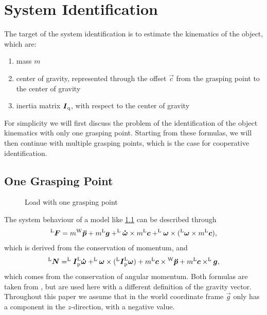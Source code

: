 

\chapter{System Identification}
\label{chap:system_identification}

The target of the system identification is to estimate the kinematics of the object, which are:
\begin{enumerate}
	\item mass $m$
	\item center of gravity, represented through the offset $\vec c$ from the grasping point to the center of gravity
	\item inertia matrix $\boldsymbol{I}_{\mathrm{q}}$, with respect to the center of gravity
\end{enumerate}

For simplicity we will first discuss the problem of the identification of the object kinematics with only one grasping point. Starting from these formulas, we will then continue with multiple grasping points, which is the case for cooperative identification.

\section{One Grasping Point}
\label{sec:one_grasping_point}

\begin{figure}
	\centering
	
	\caption{Load with one grasping point}
	\label{fig:load_one_grasping_point}
\end{figure}

The system behaviour of a model like \ref{fig:load_one_grasping_point} can be described through 
\begin{equation}
	^{\mathrm{L}}\boldsymbol{F} = m {^{\mathrm{W}}}\boldsymbol{\ddot{p}} + m ^{\mathrm{L}}\boldsymbol{g} + ^{\mathrm{L}}\boldsymbol{\dot{\omega}} \times m ^{\mathrm{L}}\boldsymbol{c} + ^{\mathrm{L}}\boldsymbol{\omega} \times (^{\mathrm{L}}\boldsymbol{\omega} \times m ^{\mathrm{L}}\boldsymbol{c}),
	\label{eq:force}
\end{equation}
which is derived from the conservation of momentum, and
\begin{equation}
	^{\mathrm{L}}\boldsymbol{N} = ^{\mathrm{L}}\boldsymbol{I}_{\mathrm{p}} ^{\mathrm{L}}\boldsymbol{\dot{\omega}} + ^{\mathrm{L}}\boldsymbol{\omega} \times (^{\mathrm{L}}\boldsymbol{I}_{\mathrm{p}} ^{\mathrm{L}}\boldsymbol{\omega}) + m ^{\mathrm{L}}\boldsymbol{c} \times {^{\mathrm{W}}}\boldsymbol{\ddot{p}} + m ^{\mathrm{L}}\boldsymbol{c} \times ^{\mathrm{L}}\boldsymbol{g},
	\label{eq:torque}
\end{equation}
which comes from the conservation of angular momentum. Both formulas are taken from \cite{literaturstelle1}, but are used here with a different definition of the gravity vector. Throughout this paper we assume that in the world coordinate frame $\vec g$ only has a component in the $z$-direction, with a negative value.

